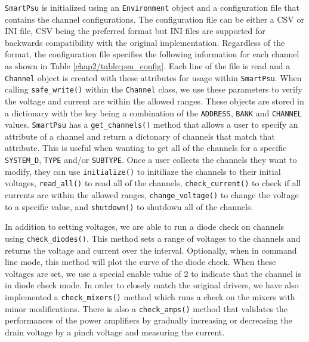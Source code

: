 \texttt{SmartPsu} is initialized using an \texttt{Environment} object and a configuration file that contains the channel configurations.
The configuration file can be either a CSV or INI file, CSV being the preferred format but INI files are supported for backwards compatibility with the original implementation.
Regardless of the format, the configuration file specifies the following information for each channel as shown in Table \ref{chap2/table:psu_config}.
Each line of the file is read and a \texttt{Channel} object is created with these attributes for usage within \texttt{SmartPsu}.
When calling \texttt{safe\_write()} within the \texttt{Channel} class, we use these parameters to verify the voltage and current are within the allowed ranges.
These objects are stored in a dictionary with the key being a combination of the \texttt{ADDRESS}, \texttt{BANK} and \texttt{CHANNEL} values.
\texttt{SmartPsu} has a \texttt{get\_channels()} method that allows a user to specify an attribute of a channel and return a dictonary of channels that match that attribute.
This is useful when wanting to get all of the channels for a specific \texttt{SYSTEM\_D}, \texttt{TYPE} and/or \texttt{SUBTYPE}.
Once a user collects the channels they want to modify, they can use \texttt{initialize()} to initiliaze the channels to their initial voltages, \texttt{read\_all()} to read all of the channels, \texttt{check\_current()} to check if all currents are within the allowed ranges, \texttt{change\_voltage()} to change the voltage to a specific value, and \texttt{shutdown()} to shutdown all of the channels.

In addition to setting voltages, we are able to run a diode check on channels using \texttt{check\_diodes()}. 
This method sets a range of voltages to the channels and returns the voltage and current over the interval.
Optionally, when in command line mode, this method will plot the curve of the diode check. 
When these voltages are set, we use a special enable value of 2 to indicate that the channel is in diode check mode. 
In order to closely match the original drivers, we have also implemented a \texttt{check\_mixers()} method which runs a check on the mixers with minor modifications.
There is also a \texttt{check\_amps()} method that validates the performances of the power amplifiers by gradually increasing or decreasing the drain voltage by a pinch voltage and measuring the current.

